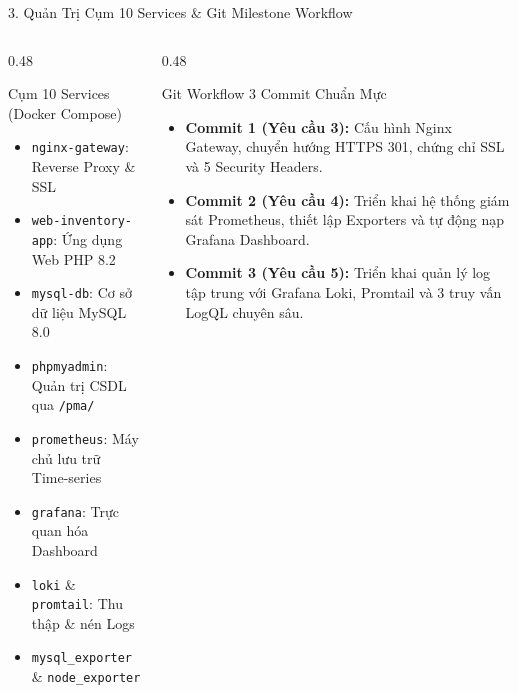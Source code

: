 \documentclass[aspectratio=169,10pt]{beamer}
\begin{document}
\begin{frame}{3. Quản Trị Cụm 10 Services \& Git Milestone Workflow}
    \begin{columns}[T]
        \begin{column}{0.48\textwidth}
            \begin{block}{Cụm 10 Services (Docker Compose)}
                \begin{itemize}
                    \item \texttt{nginx-gateway}: Reverse Proxy \& SSL
                    \item \texttt{web-inventory-app}: Ứng dụng Web PHP 8.2
                    \item \texttt{mysql-db}: Cơ sở dữ liệu MySQL 8.0
                    \item \texttt{phpmyadmin}: Quản trị CSDL qua \texttt{/pma/}
                    \item \texttt{prometheus}: Máy chủ lưu trữ Time-series
                    \item \texttt{grafana}: Trực quan hóa Dashboard
                    \item \texttt{loki} \& \texttt{promtail}: Thu thập \& nén Logs
                    \item \texttt{mysql\_exporter} \& \texttt{node\_exporter}
                \end{itemize}
            \end{block}
        \end{column}

        \begin{column}{0.48\textwidth}
            \begin{exampleblock}{Git Workflow 3 Commit Chuẩn Mực}
                \begin{itemize}
                    \item \textbf{Commit 1 (Yêu cầu 3):} Cấu hình Nginx Gateway, chuyển hướng HTTPS 301, chứng chỉ SSL và 5 Security Headers.
                    \item \textbf{Commit 2 (Yêu cầu 4):} Triển khai hệ thống giám sát Prometheus, thiết lập Exporters và tự động nạp Grafana Dashboard.
                    \item \textbf{Commit 3 (Yêu cầu 5):} Triển khai quản lý log tập trung với Grafana Loki, Promtail và 3 truy vấn LogQL chuyên sâu.
                \end{itemize}
            \end{exampleblock}
        \end{column}
    \end{columns}
\end{frame}
\end{document}
